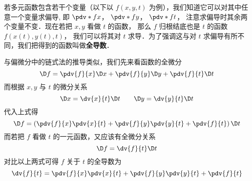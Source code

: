 

若多元函数包含若干个变量（以下以 $f(x,y,t)$ 为例），我们知道它可以对其中任意一个变量求偏导, 即 $\pdv*{f}{x}$，  $\pdv*{f}{y}$，  $\pdv*{f}{t}$， 注意求偏导时其余两个变量不变．现在若把 $x,y$ 看做 $t$ 的函数， 那么 $f$ 归根结底也是 $t$ 的函数 $f(x(t),y(t),t)$， 我们可以将其对 $t$ 求导．为了强调这与对 $t$ 求偏导有所不同，我们把得到的函数叫做\textbf{全导数}．

与偏微分中的链式法的推导类似，我们先来看函数的全微分
\begin{equation}
\D f = \pdv{f}{x}\D x + \pdv{f}{y}\D y + \pdv{f}{t}\D t
\end{equation}
而根据 $x,y$ 与 $t$ 的微分关系
\begin{equation}
\D x = \dv{x}{t}\D t \qquad  \D y = \dv{y}{t}\D t
\end{equation}
代入上式得
\begin{equation}
\D f = \left( \pdv{f}{x}\pdv{x}{t} + \pdv{f}{y}\pdv{y}{t} + \pdv{f}{t} \right)\D t
\end{equation}
而若把 $f$ 看做 $t$ 的一元函数，又应该有全微分关系
\begin{equation}
\D f = \dv{f}{t} \D t
\end{equation}
对比以上两式可得 $f$ 关于 $t$ 的全导数为
\begin{equation}
\dv{f}{t} = \pdv{f}{x}\pdv{x}{t} + \pdv{f}{y}\pdv{y}{t} + \pdv{f}{t}
\end{equation}

